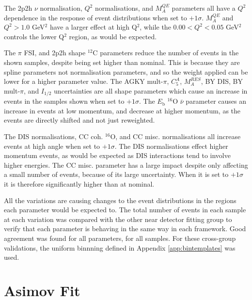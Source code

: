 The 2p2h $\nu$ normalisation, $Q^2$ normalisations, and $M^{QE}_A$ parameters all have a $Q^2$ dependence in the response of event distributions when set to $+1\sigma$. $M^{QE}_A$ and $Q^{2}>1.0$ GeV$^2$ have a larger effect at high Q$^2$, while the $0.00<Q^{2}<0.05$ GeV$^2$ controls the lower Q$^2$ region, as would be expected.

The $\pi$ FSI, and 2p2h shape $^{12}$C parameters reduce the number of events in the shown samples, despite being set higher than nominal. This is because they are spline parameters not normalisation parameters, and so the weight applied can be lower for a higher parameter value. The AGKY mult-$\pi$, $C^{A}_{5}$, $M^{RES}_{A}$, BY DIS, BY mult-$\pi$, and $I_{1/2}$ uncertainties are all shape parameters which cause an increase in events in the samples shown when set to $+1\sigma$. The $E_{\mathrm{b}}$ $^{16}$O $\bar{\nu}$ parameter causes an increase in events at low momentum, and decrease at higher momentum, as the events are directly shifted and not just reweighted.

The DIS normalisations, CC coh. $^{16}$O, and CC misc. normalisations all increase events at high angle when set to $+1\sigma$. The DIS normalisations effect higher momentum events, as would be expected as DIS interactions tend to involve higher energies. The CC misc. parameter has a large impact despite only affecting a small number of events, because of its large uncertainty. When it is set to $+1\sigma$ it is therefore significantly higher than at nominal.

All the variations are causing changes to the event distributions in the regions each parameter would be expected to. The total number of events in each sample at each variation was compared with the other near detector fitting group to verify that each parameter is behaving in the same way in each framework. Good agreement was found for all parameters, for all samples. For these cross-group validations, the uniform binnning defined in Appendix \ref{app:bintemplates} was used.

\section{Asimov Fit}\label{sec:asimov}

